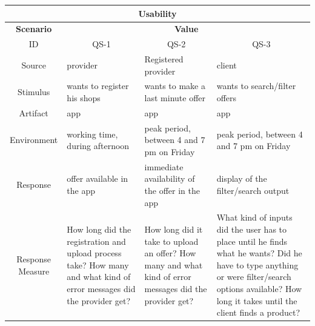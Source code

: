 \begin{table}[H]
    \begin{tabularx}{\textwidth}{|c|X|X|X|}
        \hline
        \multicolumn{4}{c}{\textbf{Usability}} \\
        \hline
        \toprule
        \multicolumn{1}{|c|}{\textbf{Scenario}} & \multicolumn{3}{|c|}{\textbf{Value}} \\
        \midrule
        \multicolumn{1}{|c|}{ID} & \multicolumn{1}{|c|}{QS-1} & \multicolumn{1}{|c|}{QS-2} & \multicolumn{1}{|c|}{QS-3}  \\
        \hline
        Source & \Gls{provider} & Registered \Gls{provider} & \Gls{client}  \\
        \hline
        Stimulus & wants to register his shops & wants to make a last minute offer & wants to search/filter offers \\
        \hline
        Artifact & app & app & app \\
        \hline
        Environment & working time, during afternoon & peak period, between 4 and 7 pm on Friday & peak period, between 4 and 7 pm on Friday \\
        \hline
        Response & offer available in the app & immediate availability of the offer in the app & display of the filter/search output \\
        \hline
        Response Measure & How long did the registration and upload process take? How many and what kind of error messages did the \gls{provider} get?
        & How long did it take to upload an offer? How many and what kind of error messages did the \gls{provider} get? 
        & What kind of inputs did the user has to place until he finds what he wants? Did he have to type anything or were filter/search
        options available? How long it takes until the client finds a product? \\
        \bottomrule
    \end{tabularx}
\end{table}


